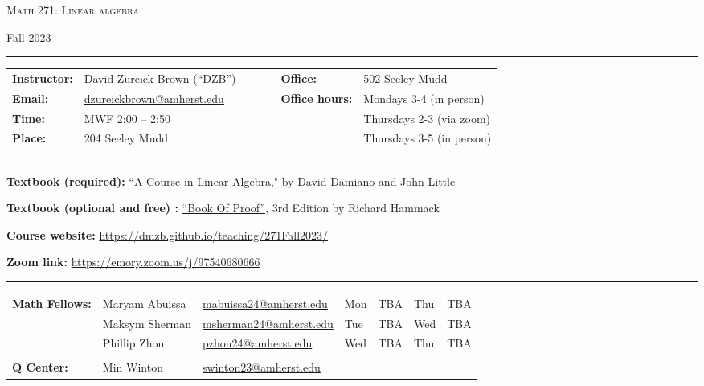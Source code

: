 \documentclass[12pt]{article}
\begin{document}
\begin{center}
{\Large \textsc{Math 271: Linear algebra}}
\end{center}
\begin{center}
Fall 2023
\end{center}

\hrule \smallskip

\noindent \begin{tabular}{@{}llcccll}
\textbf{Instructor:} & David Zureick-Brown (``DZB'') & & & & \textbf{Office:} & 502 Seeley Mudd \\
 \textbf{Email:} & \href{mailto: dzureickbrown@amherst.edu}{dzureickbrown@amherst.edu} & & & & \textbf{Office hours:} & Mondays 3-4 (in person)\\
 \textbf{Time:} & MWF 2:00 -- 2:50 & & & & &Thursdays 2-3 (via zoom) \\
 \textbf{Place:} & 204 Seeley Mudd & & & & & Thursdays 3-5 (in person)
\end{tabular}

\smallskip \hrule \medskip

\noindent\textbf{Textbook (required):}
\href{https://www.amazon.com/Course-Linear-Algebra-Dover-Mathematics/dp/0486469085}
{``A Course in Linear Algebra,"} by David Damiano and John Little
\medskip

\noindent\textbf{Textbook (optional and free) :}
\href{https://www.people.vcu.edu/~rhammack/BookOfProof/}
{``Book Of Proof'',} 3rd Edition by Richard Hammack
\medskip

\noindent\textbf{Course website:} \url{https://dmzb.github.io/teaching/271Fall2023/}
\medskip

\noindent\textbf{Zoom link:} \url{https://emory.zoom.us/j/97540680666}

\medskip \hrule \smallskip

\noindent \begin{tabular}{@{}lllllll}

\textbf{Math Fellows:} & Maryam Abuissa & \href{mailto: mabuissa24@amherst.edu}{mabuissa24@amherst.edu} & Mon &TBA & Thu &TBA \\
 & Maksym Sherman & \href{mailto: msherman24@amherst.edu}{msherman24@amherst.edu} & Tue & TBA & Wed & TBA \\
& Phillip Zhou & \href{mailto: pzhou24@amherst.edu}{pzhou24@amherst.edu} & Wed &TBA & Thu & TBA \\
 & & & & & &\\ 
\textbf{Q Center:}& Min Winton & \href{mailto: swinton23@amherst.edu}{swinton23@amherst.edu} & & & &
\end{tabular}
\end{document}
